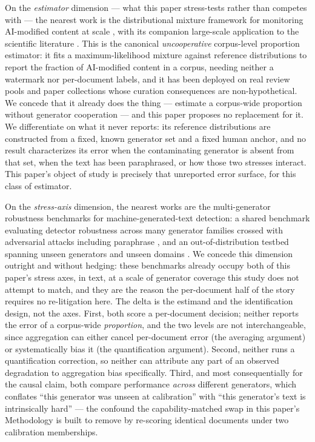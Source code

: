 \documentclass[11pt]{article}
\begin{document}
On the \emph{estimator} dimension --- what this paper stress-tests rather than competes with --- the nearest work is the distributional mixture framework for monitoring AI-modified content at scale \citep{MonitoringAIContent2024}, with its companion large-scale application to the scientific literature \citep{MappingLLMUse2024}. This is the canonical \emph{uncooperative} corpus-level proportion estimator: it fits a maximum-likelihood mixture against reference distributions to report the fraction of AI-modified content in a corpus, needing neither a watermark nor per-document labels, and it has been deployed on real review pools and paper collections whose curation consequences are non-hypothetical. We concede that it already does the thing --- estimate a corpus-wide proportion without generator cooperation --- and this paper proposes no replacement for it. We differentiate on what it never reports: its reference distributions are constructed from a fixed, known generator set and a fixed human anchor, and no result characterizes its error when the contaminating generator is absent from that set, when the text has been paraphrased, or how those two stresses interact. This paper's object of study is precisely that unreported error surface, for this class of estimator.

On the \emph{stress-axis} dimension, the nearest works are the multi-generator robustness benchmarks for machine-generated-text detection: a shared benchmark evaluating detector robustness across many generator families crossed with adversarial attacks including paraphrase \citep{RAID2024Benchmark}, and an out-of-distribution testbed spanning unseen generators and unseen domains \citep{MAGE2024InTheWild}. We concede this dimension outright and without hedging: these benchmarks already occupy both of this paper's stress axes, in text, at a scale of generator coverage this study does not attempt to match, and they are the reason the per-document half of the story requires no re-litigation here. The delta is the estimand and the identification design, not the axes. First, both score a per-document decision; neither reports the error of a corpus-wide \emph{proportion}, and the two levels are not interchangeable, since aggregation can either cancel per-document error (the averaging argument) or systematically bias it (the quantification argument). Second, neither runs a quantification correction, so neither can attribute any part of an observed degradation to aggregation bias specifically. Third, and most consequentially for the causal claim, both compare performance \emph{across} different generators, which conflates ``this generator was unseen at calibration'' with ``this generator's text is intrinsically hard'' --- the confound the capability-matched swap in this paper's Methodology is built to remove by re-scoring identical documents under two calibration memberships.
\end{document}
